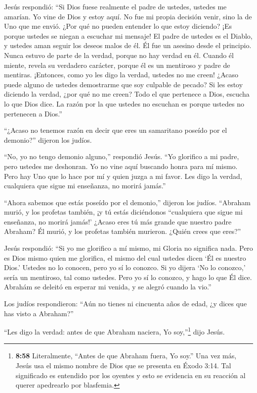  Jesús respondió: ``Si Dios fuese realmente el padre de
ustedes, ustedes me amarían. Yo vine de Dios y estoy aquí. No fue mi
propia decisión venir, sino la de Uno que me envió.  ¿Por
qué no pueden entender lo que estoy diciendo? ¡Es porque ustedes se
niegan a escuchar mi mensaje!  El padre de ustedes es el
Diablo, y ustedes aman seguir los deseos malos de él. Él fue un asesino
desde el principio. Nunca estuvo de parte de la verdad, porque no hay
verdad en él. Cuando él miente, revela su verdadero carácter, porque él
es un mentiroso y padre de mentiras.  ¡Entonces, como yo
les digo la verdad, ustedes no me creen!  ¿Acaso puede
alguno de ustedes demostrarme que soy culpable de pecado? Si les estoy
diciendo la verdad, ¿por qué no me creen?  Todo el que
pertenece a Dios, escucha lo que Dios dice. La razón por la que ustedes
no escuchan es porque ustedes no pertenecen a Dios.''

 ``¿Acaso no tenemos razón en decir que eres un samaritano
poseído por el demonio?'' dijeron los judíos.

 ``No, yo no tengo demonio alguno,'' respondió Jesús. ``Yo
glorifico a mi padre, pero ustedes me deshonran.  Yo no
vine aquí buscando honra para mí mismo. Pero hay Uno que lo hace por mí
y quien juzga a mi favor.  Les digo la verdad, cualquiera
que sigue mi enseñanza, no morirá jamás.''

 ``Ahora sabemos que estás poseído por el demonio,''
dijeron los judíos. ``Abraham murió, y los profetas también, ¡y tú estás
diciéndonos ``cualquiera que sigue mi enseñanza, no morirá jamás!'
 ¿Acaso eres tú más grande que nuestro padre Abraham? Él
murió, y los profetas también murieron. ¿Quién crees que eres?''

 Jesús respondió: ``Si yo me glorifico a mí mismo, mi
Gloria no significa nada. Pero es Dios mismo quien me glorifica, el
mismo del cual ustedes dicen `Él es nuestro Dios.'  Ustedes
no lo conocen, pero yo sí lo conozco. Si yo dijera `No lo conozco,'
sería un mentiroso, tal como ustedes. Pero yo sí lo conozco, y hago lo
que Él dice.  Abrahám se deleitó en esperar mi venida, y se
alegró cuando la vio.''

 Los judíos respondieron: ``Aún no tienes ni cincuenta años
de edad, ¿y dices que has visto a Abraham?''

 ``Les digo la verdad: antes de que Abraham naciera, Yo
soy,''\footnote{\textbf{8:58} Literalmente, ``Antes de que Abraham
  fuera, Yo soy.'' Una vez más, Jesús usa el mismo nombre de Dios que se
  presenta en Éxodo 3:14. Tal significado es entendido por los oyentes y
  esto se evidencia en su reacción al querer apedrearlo por blasfemia.}
dijo Jesús.


